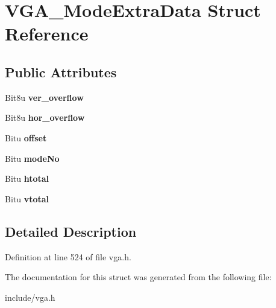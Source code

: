 \hypertarget{structVGA__ModeExtraData}{\section{V\-G\-A\-\_\-\-Mode\-Extra\-Data Struct Reference}
\label{structVGA__ModeExtraData}
}
\subsection*{Public Attributes}
\begin{DoxyCompactItemize}
\item 
\hypertarget{structVGA__ModeExtraData_a020b5a995f7d52935b5e4fb5899fe72d}{Bit8u {\bfseries ver\-\_\-overflow}}\label{structVGA__ModeExtraData_a020b5a995f7d52935b5e4fb5899fe72d}

\item 
\hypertarget{structVGA__ModeExtraData_a60204db357ea608c5f03a8d59c80d3ff}{Bit8u {\bfseries hor\-\_\-overflow}}\label{structVGA__ModeExtraData_a60204db357ea608c5f03a8d59c80d3ff}

\item 
\hypertarget{structVGA__ModeExtraData_a11bba06bf4bcd5cb9aca1442e5d9b368}{Bitu {\bfseries offset}}\label{structVGA__ModeExtraData_a11bba06bf4bcd5cb9aca1442e5d9b368}

\item 
\hypertarget{structVGA__ModeExtraData_a4af1e6bf83f95024c09802255715702a}{Bitu {\bfseries mode\-No}}\label{structVGA__ModeExtraData_a4af1e6bf83f95024c09802255715702a}

\item 
\hypertarget{structVGA__ModeExtraData_a21c6015134a307927a2ab9915c2dfb41}{Bitu {\bfseries htotal}}\label{structVGA__ModeExtraData_a21c6015134a307927a2ab9915c2dfb41}

\item 
\hypertarget{structVGA__ModeExtraData_a9410324359daa0b31e4026d9e70aeae0}{Bitu {\bfseries vtotal}}\label{structVGA__ModeExtraData_a9410324359daa0b31e4026d9e70aeae0}

\end{DoxyCompactItemize}


\subsection{Detailed Description}


Definition at line 524 of file vga.\-h.



The documentation for this struct was generated from the following file\-:\begin{DoxyCompactItemize}
\item 
include/vga.\-h\end{DoxyCompactItemize}
